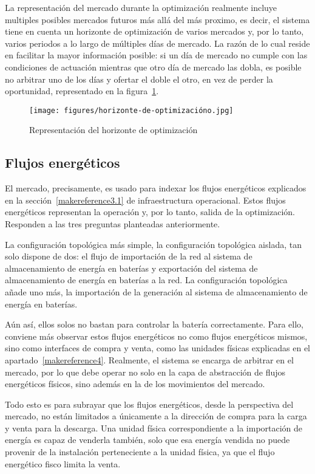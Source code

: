 La representación del mercado durante la optimización realmente incluye multiples posibles mercados futuros más allá del más proximo, es decir, el sistema tiene en cuenta un horizonte de optimización de varios mercados y, por lo tanto, varios periodos a lo largo de múltiples días de mercado. La razón de lo cual reside en facilitar la mayor información posible: si un día de mercado no cumple con las condiciones de actuación mientras que otro día de mercado las dobla, es posible no arbitrar uno de los días y ofertar el doble el otro, en vez de perder la oportunidad, representado en la figura~\ref{fig:horizonte-de-optimizacióno}.

\begin{figure}
  \centering
  \texttt{[image: figures/horizonte-de-optimizacióno.jpg]}
  \caption{Representación del horizonte de optimización}
  \label{fig:horizonte-de-optimizacióno}
\end{figure}

\subsection{Flujos energéticos}
\label{makereference5.1.2}

El mercado, precisamente, es usado para indexar los flujos energéticos explicados en la sección~\ref{makereference3.1} de infraestructura operacional. Estos flujos energéticos representan la operación y, por lo tanto, salida de la optimización. Responden a las tres preguntas planteadas anteriormente.

La configuración topológica más simple, la configuración topológica aislada, tan solo dispone de dos: el flujo de importación de la red al sistema de almacenamiento de energía en baterías y exportación del sistema de almacenamiento de energía en baterías a la red. La configuración topológica añade uno más, la importación de la generación al sistema de almacenamiento de energía en baterías.

Aún así, ellos solos no bastan para controlar la batería correctamente. Para ello, conviene más observar estos flujos energéticos no como flujos energéticos mismos, sino como interfaces de compra y venta, como las unidades físicas explicadas en el apartado~\ref{makereference4}. Realmente, el sistema se encarga de arbitrar en el mercado, por lo que debe operar no solo en la capa de abstracción de flujos energéticos físicos, sino además en la de los movimientos del mercado.

Todo esto es para subrayar que los flujos energéticos, desde la perspectiva del mercado, no están limitados a únicamente a la dirección de compra para la carga y venta para la descarga. Una unidad física correspondiente a la importación de energía es capaz de venderla también, solo que esa energía vendida no puede provenir de la instalación perteneciente a la unidad física, ya que el flujo energético fisco limita la venta.

